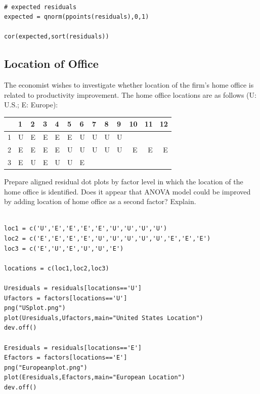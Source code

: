 \documentclass[11pt]{article}
\begin{document}
\begin{verbatim}

# expected residuals
expected = qnorm(ppoints(residuals),0,1)

cor(expected,sort(residuals))
\end{verbatim}
\subsection{Location of Office}
\label{sec-1-3}

The economist wishes to investigate whether location of the firm's
home office is related to productivity improvement.  The home office
locations are as follows (U: U.S.; E: Europe):

\begin{center}
\begin{tabular}{rlllllllllrrr}
\hline
    &  1  &  2  &  3  &  4  &  5  &  6  &  7  &  8  &  9  &  10  &  11  &  12  \\
\hline
 1  &  U  &  E  &  E  &  E  &  E  &  U  &  U  &  U  &  U  &      &      &      \\
 2  &  E  &  E  &  E  &  E  &  U  &  U  &  U  &  U  &  U  &   E  &   E  &   E  \\
 3  &  E  &  U  &  E  &  U  &  U  &  E  &     &     &     &      &      &      \\
\hline
\end{tabular}
\end{center}



Prepare aligned residual dot plots by factor level in which the
location of the home office is identified.  Does it appear that ANOVA
model could be improved by adding location of home office as a second
factor?  Explain.


\begin{verbatim}

loc1 = c('U','E','E','E','E','U','U','U','U')
loc2 = c('E','E','E','E','U','U','U','U','U','E','E','E')
loc3 = c('E','U','E','U','U','E')

locations = c(loc1,loc2,loc3)

Uresiduals = residuals[locations=='U']
Ufactors = factors[locations=='U']
png("USplot.png")
plot(Uresiduals,Ufactors,main="United States Location")
dev.off()

Eresiduals = residuals[locations=='E']
Efactors = factors[locations=='E']
png("Europeanplot.png")
plot(Eresiduals,Efactors,main="European Location")
dev.off()
\end{verbatim}
\end{document}
